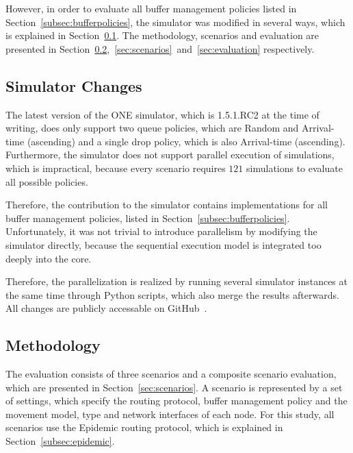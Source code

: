 \documentclass[conference,10pt,letterpaper,final]{IEEEtran}
\begin{document}
However, in order to evaluate all buffer management policies listed in Section~\ref{subsec:bufferpolicies}, the simulator was modified in several ways, which is explained in Section~\ref{subsec:simchange}.
The methodology, scenarios and evaluation are presented in Section~\ref{subsec:method},~\ref{sec:scenarios}~and~\ref{sec:evaluation} respectively.


\subsection{Simulator Changes}
\label{subsec:simchange}

The latest version of the ONE simulator, which is 1.5.1.RC2 at the time of writing, does only support two queue policies, which are Random and Arrival-time (ascending) and a single drop policy, which is also Arrival-time (ascending).
Furthermore, the simulator does not support parallel execution of simulations, which is impractical, because every scenario requires $121$ simulations to evaluate all possible policies.

Therefore, the contribution to the simulator contains implementations for all buffer management policies, listed in Section~\ref{subsec:bufferpolicies}.
Unfortunately, it was not trivial to introduce parallelism by modifying the simulator directly, because the sequential execution model is integrated too deeply into the core.

Therefore, the parallelization is realized by running several simulator instances at the same time through Python scripts, which also merge the results afterwards.
All changes are publicly accessable on GitHub~\cite{github}.


\subsection{Methodology}
\label{subsec:method}

The evaluation consists of three scenarios and a composite scenario evaluation, which are presented in Section~\ref{sec:scenarios}.
A scenario is represented by a set of settings, which specify the routing protocol, buffer management policy and the movement model, type and network interfaces of each node.
For this study, all scenarios use the Epidemic routing protocol, which is explained in Section~\ref{subsec:epidemic}.
\end{document}
